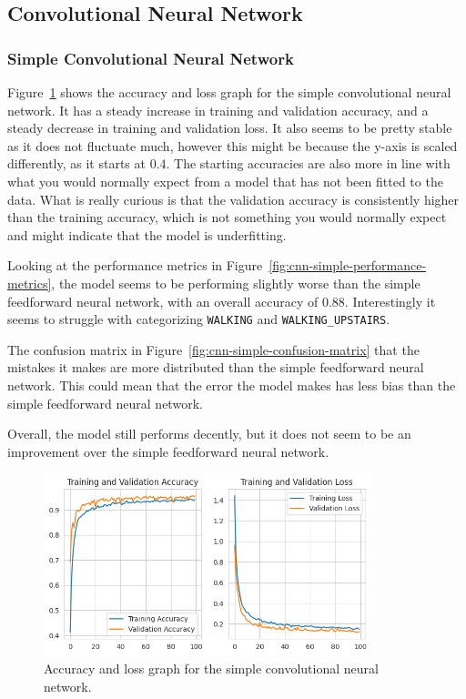 \subsection{Convolutional Neural Network}\label{subsec:convolutional-neural-network}

\subsubsection{Simple Convolutional Neural Network}

Figure~\ref{fig:cnn-simple-accuracy-loss-graph} shows the accuracy and loss graph for the simple convolutional neural network.
It has a steady increase in training and validation accuracy, and a steady decrease in training and validation loss.
It also seems to be pretty stable as it does not fluctuate much, however this might be because the y-axis is scaled differently, as it starts at 0.4.
The starting accuracies are also more in line with what you would normally expect from a model that has not been fitted to the data.
What is really curious is that the validation accuracy is consistently higher than the training accuracy, which is not something you would normally expect and might indicate that the model is underfitting.

Looking at the performance metrics in Figure~\ref{fig:cnn-simple-performance-metrics}, the model seems to be performing slightly worse than the simple feedforward neural network, with an overall accuracy of 0.88.
Interestingly it seems to struggle with categorizing \texttt{WALKING} and \texttt{WALKING\_UPSTAIRS}.

The confusion matrix in Figure~\ref{fig:cnn-simple-confusion-matrix} that the mistakes it makes are more distributed than the simple feedforward neural network.
This could mean that the error the model makes has less bias than the simple feedforward neural network.

Overall, the model still performs decently, but it does not seem to be an improvement over the simple feedforward neural network.

\begin{figure}[ht]
    \centering
    \includegraphics[width=0.85\textwidth]{./img/cnn/simple/accuracy-loss-graph}
    \caption{Accuracy and loss graph for the simple convolutional neural network.}
    \label{fig:cnn-simple-accuracy-loss-graph}
\end{figure}

